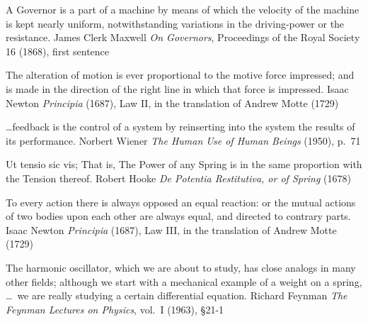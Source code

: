 %

  {A Governor is a part of a machine by means of which the velocity of the machine is kept nearly
   uniform, notwithstanding variations in the driving-power or the resistance.}
  {James Clerk Maxwell}
  {\emph{On Governors}, Proceedings of the Royal Society 16 (1868), first sentence}

  {The alteration of motion is ever proportional to the motive force impressed; and is made in
   the direction of the right line in which that force is impressed.}
  {Isaac Newton}
  {\emph{Principia} (1687), Law II, in the translation of Andrew Motte (1729)}

  {\ldots feedback is the control of a system by reinserting into the system the results of its
   performance.}
  {Norbert Wiener}
  {\emph{The Human Use of Human Beings} (1950), p.~71}

  {Ut tensio sic vis; That is, The Power of any Spring is in the same proportion with the Tension
   thereof.}
  {Robert Hooke}
  {\emph{De Potentia Restitutiva, or of Spring} (1678)}

  {To every action there is always opposed an equal reaction: or the mutual actions of two bodies
   upon each other are always equal, and directed to contrary parts.}
  {Isaac Newton}
  {\emph{Principia} (1687), Law III, in the translation of Andrew Motte (1729)}

  {The harmonic oscillator, which we are about to study, has close analogs in many other fields;
   although we start with a mechanical example of a weight on a spring, \ldots\ we are really
   studying a certain differential equation.}
  {Richard Feynman}
  {\emph{The Feynman Lectures on Physics}, vol.~I (1963), §21-1}

